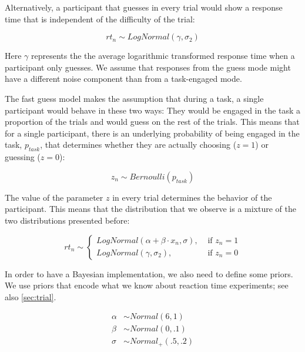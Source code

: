 \documentclass[12pt,]{krantz}
\theoremstyle{definition}
\theoremstyle{definition}
\theoremstyle{definition}
\theoremstyle{remark}
\begin{document}
Alternatively, a participant that guesses in every trial would show a response time that is independent of the difficulty of the trial:

\begin{equation}
rt_n \sim LogNormal(\gamma, \sigma_2)
\end{equation}

Here \(\gamma\) represents the the average logarithmic transformed response time when a participant only guesses. We assume that responses from the guess mode might have a different noise component than from a task-engaged mode.

The fast guess model makes the assumption that during a task, a single participant would behave in these two ways: They would be engaged in the task a proportion of the trials and would guess on the rest of the trials. This means that for a single participant, there is an underlying probability of being engaged in the task, \(p_{task}\), that determines whether they are actually choosing (\(z=1\)) or guessing (\(z=0\)):

\begin{equation}
z_n \sim Bernoulli(p_{task})
\end{equation}

The value of the parameter \(z\) in every trial determines the behavior of the participant. This means that the distribution that we observe is a mixture of the two distributions presented before:

\begin{equation}
rt_n \sim 
\begin{cases}
LogNormal(\alpha + \beta \cdot x_n, \sigma), & \text{ if } z_n =1 \\
LogNormal(\gamma, \sigma_2), & \text{ if } z_n=0
\end{cases}
\label{eq:dismix}
\end{equation}

In order to have a Bayesian implementation, we also need to define some priors. We use priors that encode what we know about reaction time experiments; see also \ref{sec:trial}.

\begin{equation}
\begin{aligned}
\alpha &\sim Normal(6, 1)\\
\beta &\sim Normal(0, .1)\\
\sigma &\sim Normal_+(.5, .2)
\end{aligned}
\end{equation}
\end{document}
